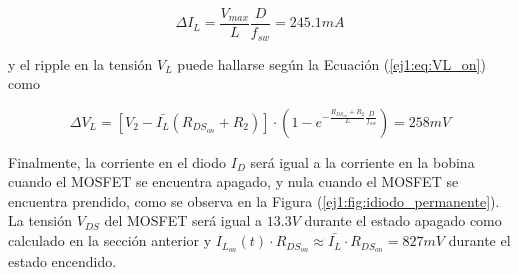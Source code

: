 \begin{equation}
\Delta I_L = \frac{V_{max}}{L}\frac{D}{f_{sw}} = 245.1mA
\end{equation}

y el ripple en la tensión $V_L$ puede hallarse según la Ecuación (\ref{ej1:eq:VL_on}) como

\begin{equation}
\Delta V_L = \left[ V_2 - \bar{I_L} (R_{DS_{on}}+R_2) \right] \cdot (1-e^{-\frac{R_{DS_{on}} + R_2}{L}\frac{D}{f_{sw}}}) = 258mV
\end{equation}

Finalmente, la corriente en el diodo $I_{D}$ será igual a la corriente en la bobina cuando el MOSFET se encuentra apagado, y nula cuando el MOSFET se encuentra prendido, como se observa en la Figura (\ref{ej1:fig:idiodo_permanente}). La tensión $V_{DS}$ del MOSFET será igual a $13.3V$ durante el estado apagado como calculado en la sección anterior y $I_{L_{on}}(t) \cdot R_{DS_{on}} \approx \bar{I_L} \cdot R_{DS_{on}} = 827mV$ durante el estado encendido.

